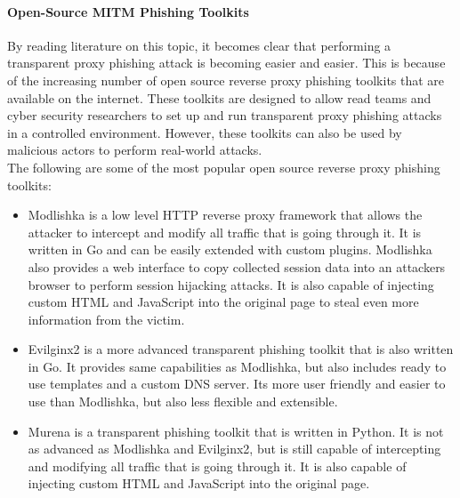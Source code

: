 \documentclass[12pt]{scrbook}
\begin{document}
\paragraph{Open-Source MITM Phishing Toolkits}
By reading literature on this topic, it becomes clear that
performing a transparent proxy phishing attack is
becoming easier and easier. This is because of the increasing number of open
source reverse proxy phishing toolkits that are available on the internet. These
toolkits are designed to allow read teams and cyber security researchers to set
up and run transparent proxy phishing attacks in a controlled environment.
However, these toolkits can also be used by malicious actors to perform
real-world attacks.\\The following are some of the most popular open source
reverse proxy phishing toolkits:
\begin{itemize}
	\item Modlishka \cite{ModlishkaGithub} is a low level HTTP reverse proxy framework
	      that allows the
	      attacker to intercept and modify all traffic that is going through it. It
	      is
	      written in Go and can be easily extended with custom plugins. Modlishka
	      also
	      provides a web interface to copy collected session data into an attackers
	      browser to perform session hijacking attacks. It is also capable of
	      injecting
	      custom HTML and JavaScript into the original page to steal even more
	      information from the victim.
	\item Evilginx2 \cite{EvilnginxGithub} is a more advanced transparent phishing
	      toolkit that is also written in Go. It provides same capabilities as
	      Modlishka, but also includes ready to use templates and a custom DNS
	      server.
	      Its more user friendly and easier to use than Modlishka, but also less
	      flexible and extensible.
	\item Murena \cite{MuraenaGithub} is a transparent phishing toolkit that is written
	      in Python. It is not as advanced as Modlishka and Evilginx2, but is still
	      capable of intercepting and modifying all traffic that is going through
	      it.
	      It is also capable of injecting custom HTML and JavaScript into the
	      original
	      page.
\end{itemize}
\end{document}
